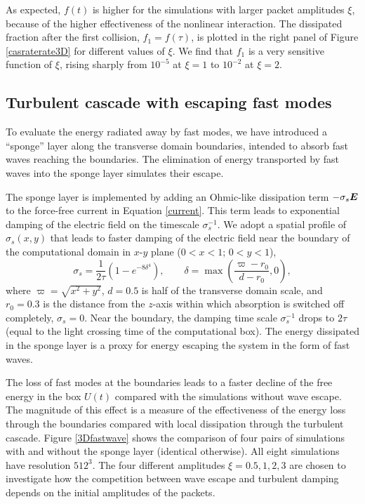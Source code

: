 As expected, $f(t)$ is higher for the simulations with larger packet amplitudes $\xi$, because of the higher effectiveness of the nonlinear interaction.
The dissipated fraction after the first collision, $f_1=f(\tau)$, is plotted in the right panel of Figure \ref{casraterate3D} for different values of $\xi$. 
We find that $f_1$ is a very sensitive function of $\xi$, rising sharply from $10^{-5}$ at $\xi = 1$ to $10^{-2}$ at $\xi = 2$. 

%
\subsection{Turbulent cascade with escaping fast modes}
%
To evaluate the energy radiated away by fast modes, we have introduced a ``sponge'' layer along the transverse domain boundaries, intended to absorb fast waves reaching the boundaries.
The elimination of energy transported by fast waves into the sponge layer simulates their escape.

The sponge layer is implemented by adding an Ohmic-like dissipation term $-\sigma_s \boldsymbol{E}$ to the force-free current in Equation \ref{current}. This term leads to exponential damping of the electric field on the timescale $\sigma_s^{-1}$. 
We adopt a spatial profile of $\sigma_s(x,y)$ that leads to faster damping of the electric field near the boundary of the computational domain in $x$-$y$ plane ($0<x<1$; $0<y<1$),
%
\begin{equation}
	\sigma_s = \frac{1}{2 \tau} \left( 1 - e^{-8 \delta^4} \right), \qquad  \delta = \max \left(\frac{\varpi - r_0}{d - r_0}, 0 \right),
\end{equation}
%
where $\varpi = \sqrt{x^2+y^2}$, $d = 0.5$ is half of the transverse domain scale, and $r_0 = 0.3$ is the distance from the $z$-axis within which absorption is switched off completely, $\sigma_s=0$.
Near the boundary, the damping time scale $\sigma_s^{-1}$ drops to $2 \tau$ (equal to the light crossing time of the computational box).
The energy dissipated in the sponge layer is a proxy for energy escaping the system in the form of fast waves.

The loss of fast modes at the boundaries leads to a faster decline of the free energy in the box $U(t)$ compared with the simulations without wave escape.
The magnitude of this effect is a measure of the effectiveness of the energy loss through the boundaries compared with local dissipation through the turbulent cascade.
Figure \ref{3Dfastwave} shows the comparison of four pairs of simulations with and without the sponge layer (identical otherwise). All eight simulations have resolution $512^3$. The four different amplitudes $\xi=0.5, 1, 2, 3$ are chosen to investigate how the competition between wave escape and turbulent damping depends on the initial amplitudes of the packets.

